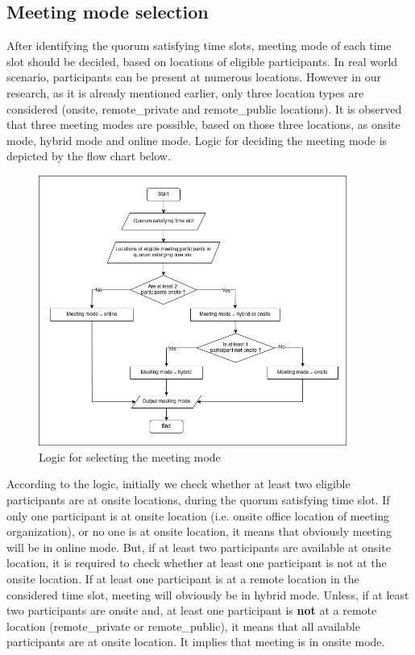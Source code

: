 \subsection{Meeting mode selection} \label{sec:logic_for_selecting_the_meeting_mode}
After identifying the quorum satisfying time slots, meeting mode of each time slot should be decided, based on locations of eligible participants. In real world scenario, participants can be present at numerous locations. However in our research, as it is already mentioned earlier, only three location types are considered (onsite, remote\_private and remote\_public locations). It is observed that three meeting modes are possible, based on those three locations, as onsite mode, hybrid mode and online mode. Logic for deciding the meeting mode is depicted by the flow chart below.
\begin{figure}[H]
    \centering
    \includegraphics[width=0.9\textwidth]{./image/meeting_mode_selection.png}
    \caption{Logic for selecting the meeting mode}
    \label{fig:logic for selecting the meeting mode}
\end{figure} 
According to the logic, initially we check whether at least two eligible participants are at onsite locations, during the quorum satisfying time slot. If only one participant is at onsite location (i.e. onsite office location of meeting organization), or no one is at onsite location, it means that obviously meeting will be in online mode. But, if at least two participants are available at onsite location, it is required to check whether at least one participant is not at the onsite location. If at least one participant is at a remote location in the considered time slot, meeting will obviously be in hybrid mode. Unless, if at least two participants are onsite and, at least one participant is \textbf{not} at a remote location (remote\_private or remote\_public), it means that all available participants are at onsite location. It implies that meeting is in onsite mode.\\ \\
